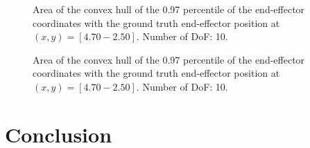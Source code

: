 \documentclass[conference]{IEEEtran}
\begin{document}
\begin{figure}[tbh]
\centering

    \caption{\label{fig:q_quantile:cVAE:10dof} Area of the convex hull of the 0.97 percentile of the end-effector coordinates with the ground truth end-effector position at $(x, y) = [4.70 -2.50]$. Number of DoF: 10.}
\end{figure}

\begin{figure}[tbh]
\centering

    \caption{\label{fig:q_quantile:INN:10dof} Area of the convex hull of the 0.97 percentile of the end-effector coordinates with the ground truth end-effector position at $(x, y) = [4.70 -2.50]$. Number of DoF: 10.}
\end{figure}

\section*{Conclusion}


\nocite{*}


\end{document}
